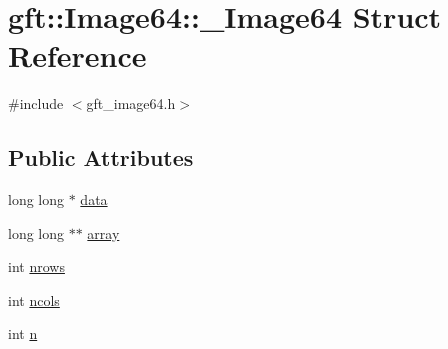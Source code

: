 \hypertarget{structgft_1_1Image64_1_1__Image64}{\section{gft\-:\-:Image64\-:\-:\-\_\-\-Image64 Struct Reference}
\label{structgft_1_1Image64_1_1__Image64}
}


{\ttfamily \#include $<$gft\-\_\-image64.\-h$>$}

\subsection*{Public Attributes}
\begin{DoxyCompactItemize}
\item 
long long $\ast$ \hyperlink{structgft_1_1Image64_1_1__Image64_a0c78dfc1f22f84c7c1dc854d0e33bbc0}{data}
\item 
long long $\ast$$\ast$ \hyperlink{structgft_1_1Image64_1_1__Image64_a5a8005455e45847975759eb51412d340}{array}
\item 
int \hyperlink{structgft_1_1Image64_1_1__Image64_a80d241238b4a992e8429517ab9725397}{nrows}
\item 
int \hyperlink{structgft_1_1Image64_1_1__Image64_a7425ad4e26726e6472acbe75e1ea9290}{ncols}
\item 
int \hyperlink{structgft_1_1Image64_1_1__Image64_a7fdc0d8158f088dc04bf35e3039d449f}{n}
\end{DoxyCompactItemize}


